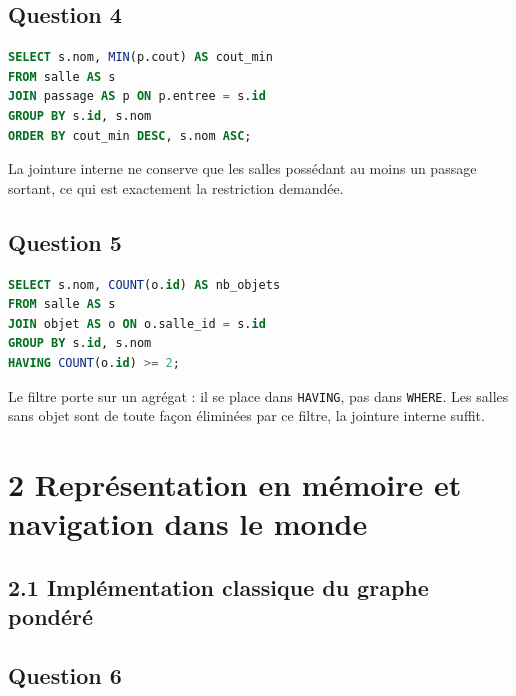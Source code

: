 \documentclass[11pt,a4paper]{article}
\begin{document}
\hypertarget{question-4}{%
\subsection{Question 4}\label{question-4}}

\begin{lstlisting}[language=SQL]
SELECT s.nom, MIN(p.cout) AS cout_min
FROM salle AS s
JOIN passage AS p ON p.entree = s.id
GROUP BY s.id, s.nom
ORDER BY cout_min DESC, s.nom ASC;
\end{lstlisting}

La jointure interne ne conserve que les salles possédant au moins un passage sortant, ce qui est exactement la restriction demandée.

\hypertarget{question-5}{%
\subsection{Question 5}\label{question-5}}

\begin{lstlisting}[language=SQL]
SELECT s.nom, COUNT(o.id) AS nb_objets
FROM salle AS s
JOIN objet AS o ON o.salle_id = s.id
GROUP BY s.id, s.nom
HAVING COUNT(o.id) >= 2;
\end{lstlisting}

Le filtre porte sur un agrégat : il se place dans \texttt{HAVING}, pas dans \texttt{WHERE}. Les salles sans objet sont de toute façon éliminées par ce filtre, la jointure interne suffit.

\hypertarget{repruxe9sentation-en-muxe9moire-et-navigation-dans-le-monde}{%
\section{2 Représentation en mémoire et navigation dans le monde}\label{repruxe9sentation-en-muxe9moire-et-navigation-dans-le-monde}}

\hypertarget{impluxe9mentation-classique-du-graphe-ponduxe9ruxe9}{%
\subsection{2.1 Implémentation classique du graphe pondéré}\label{impluxe9mentation-classique-du-graphe-ponduxe9ruxe9}}

\hypertarget{question-6}{%
\subsection{Question 6}\label{question-6}}
\end{document}
